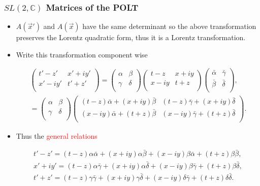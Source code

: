 \documentclass[10pt,a4paper]{beamer}
\begin{document}
\begin{frame}
\frametitle{$SL(2,\mathbb{C})$ Matrices of the POLT}
\begin{itemize}
\item<1->{$A(\vec{x}')$ and $A(\vec{x})$ have the same determinant so the above transformation preserves the Lorentz quadratic form, thus it is a Lorentz transformation.}
\item<2->{Write this transformation component wise

\begin{gather*} 
\left(
\begin{array}{cc}
t' - z' & x' + i y' \\
x' - i y' & t' + z' \\
\end{array}
\right)
=
\left(
\begin{array}{cc}
\alpha & \beta \\
\gamma & \delta \\
\end{array}
\right)
\left(
\begin{array}{cc}
t-z & x + i y \\
x - i y & t + z   \\
\end{array}
\right)
\left(
\begin{array}{cc}
\bar{\alpha} & \bar{\gamma} \\
\bar{\beta} & \bar{\delta} \\
\end{array}
\right), \\
 = \left(
\begin{array}{cc}
\alpha & \beta \\
\gamma & \delta \\
\end{array}
\right)
\left(
\begin{array}{cc}
(t-z)\bar{\alpha} + (x + iy)\bar{\beta} & (t-z)\bar{\gamma} + (x + iy)\bar{\delta} \\
(x - iy)\bar{\alpha} + (t+z)\bar{\beta} & (x-iy)\bar{\gamma} + (t+z)\bar{\delta} \\
\end{array}
\right).
\end{gather*}

}

\item<3->{Thus the \textcolor{red}{general relations}

\begin{gather*}
t' - z'  = (t-z)\alpha\bar{\alpha} + (x + iy)\alpha\bar{\beta} + (x - iy)\beta\bar{\alpha} + (t+z)\beta\bar{\beta},
\\
x' + iy'  = (t-z)\alpha\bar{\gamma} + (x + iy)\alpha\bar{\delta} + (x-iy)\beta\bar{\gamma} + (t+z)\beta\bar{\delta},
\\
t' + z'  = (t-z)\gamma\bar{\gamma} + (x + iy)\gamma\bar{\delta} + (x-iy)\delta\bar{\gamma} + (t+z)\delta\bar{\delta}.
\end{gather*}
}
\end{itemize}



\end{frame}
\end{document}
